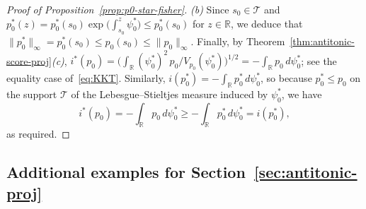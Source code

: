 \documentclass[a4paper]{article}
\newcommand{\R}{\mathbb{R}}
\newcommand{\norm}[1]{\|{#1}\|}
\theoremstyle{definition}
\begin{document}
\begin{proof}[Proof of Proposition~\ref{prop:p0-star-fisher}]
\medskip
\noindent
\textit{(b)} Since $s_0 \in \mathcal{T}$ and $p_0^*(z) = p_0^*(s_0)\exp\bigl(\int_{s_0}^z \psi_0^*\bigr) \leq p_0^*(s_0)$ for $z \in \R$, we deduce that $\norm{p_0^*}_\infty = p_0^*(s_0) \leq p_0(s_0) \leq \norm{p_0}_\infty$.
Finally, by Theorem~\ref{thm:antitonic-score-proj}\textit{(c)}, $i^*(p_0) = \bigl(\int_\R (\psi_0^*)^2\,p_0\big/V_{p_0}(\psi_0^*)\bigr)^{1/2} = -\int_\R p_0\,d\psi_0^*$; see the equality case of~\eqref{eq:KKT}. Similarly, $i(p_0^*) = -\int_\R p_0^*\,d\psi_0^*$, so because $p_0^* \leq p_0$ on the support $\mathcal{T}$ of the Lebesgue--Stieltjes measure induced by $\psi_0^*$, we have
\[
i^*(p_0) = -\int_\R p_0\,d\psi_0^* \geq -\int_\R p_0^*\,d\psi_0^* = i(p_0^*),
\]
as required.
\end{proof}

\subsection{Additional examples for Section~\ref{sec:antitonic-proj}}
\label{subsec:appendix-examples}
\end{document}
